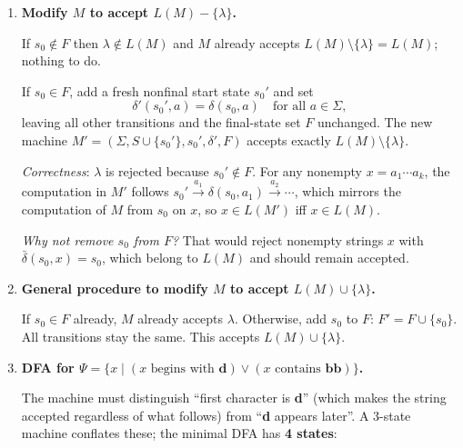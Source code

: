 \documentclass[11pt]{book}
\begin{document}
\begin{enumerate}[{1.}1.]
\begin{enumerate}
\item Each machine is a quotient or sub-machine of the 4-state product machine from Example 1.10, which tracks parities of \#a and \#b.
\end{enumerate}

\item \textbf{Modify $M$ to accept $L(M)-\{\lambda\}$.}

If $s_0 \notin F$ then $\lambda\notin L(M)$ and $M$ already accepts $L(M)\setminus\{\lambda\}=L(M)$; nothing to do.

If $s_0\in F$, add a fresh nonfinal start state $s_0'$ and set
\[
  \delta'(s_0',a)=\delta(s_0,a)\quad\text{for all }a\in\Sigma,
\]
leaving all other transitions and the final-state set $F$ unchanged.
The new machine $M'=(\Sigma,S\cup\{s_0'\},s_0',\delta',F)$ accepts exactly $L(M)\setminus\{\lambda\}$.

\emph{Correctness}: $\lambda$ is rejected because $s_0'\notin F$. For any nonempty $x=a_1\cdots a_k$, the computation in $M'$ follows $s_0'\xrightarrow{a_1}\delta(s_0,a_1)\xrightarrow{a_2}\cdots$, which mirrors the computation of $M$ from $s_0$ on $x$, so $x\in L(M')$ iff $x\in L(M)$.

\emph{Why not remove $s_0$ from $F$?} That would reject nonempty strings $x$ with $\bar\delta(s_0,x)=s_0$, which belong to $L(M)$ and should remain accepted.

\item \textbf{General procedure to modify $M$ to accept $L(M)\cup\{\lambda\}$.}

If $s_0\in F$ already, $M$ already accepts $\lambda$. Otherwise, add $s_0$ to $F$: $F' = F\cup\{s_0\}$. All transitions stay the same. This accepts $L(M)\cup\{\lambda\}$.

\item \textbf{DFA for $\Psi = \{x\mid (x\text{ begins with }\mathbf{d})\vee(x\text{ contains }\mathbf{bb})\}$.}

The machine must distinguish ``first character is \textbf{d}'' (which makes the string accepted regardless of what follows) from ``\textbf{d} appears later''.
A 3-state machine conflates these; the minimal DFA has \textbf{4 states}:


\end{enumerate}
\end{document}

